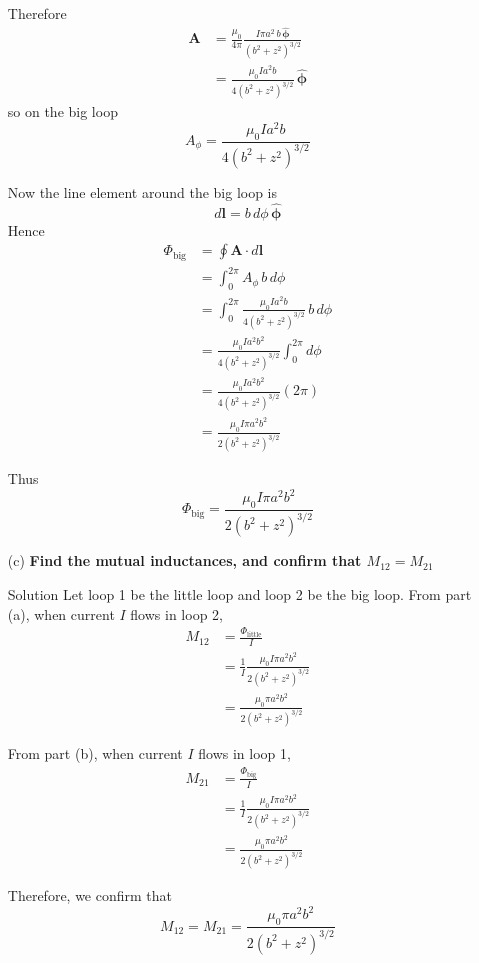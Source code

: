 \documentclass[12pt]{article}
\begin{document}
\begin{enumerate}
Therefore
\[
\begin{aligned}
\mathbf A
&=\frac{\mu_0}{4\pi}\frac{I\pi a^2\,b\,\hat{\boldsymbol\phi}}{\left(b^2+z^2\right)^{3/2}}\\[4pt]
&=\frac{\mu_0 I a^2 b}{4\left(b^2+z^2\right)^{3/2}}\,\hat{\boldsymbol\phi}
\end{aligned}
\]
so on the big loop
\[
A_\phi=\frac{\mu_0 I a^2 b}{4\left(b^2+z^2\right)^{3/2}}
\]

Now the line element around the big loop is
\[
d\mathbf l=b\,d\phi\,\hat{\boldsymbol\phi}
\]
Hence
\[
\begin{aligned}
\Phi_{\text{big}}
&=\oint \mathbf A\cdot d\mathbf l\\[4pt]
&=\int_0^{2\pi} A_\phi\,b\,d\phi\\[4pt]
&=\int_0^{2\pi}\frac{\mu_0 I a^2 b}{4\left(b^2+z^2\right)^{3/2}}\,b\,d\phi\\[4pt]
&=\frac{\mu_0 I a^2 b^2}{4\left(b^2+z^2\right)^{3/2}}\int_0^{2\pi} d\phi\\[4pt]
&=\frac{\mu_0 I a^2 b^2}{4\left(b^2+z^2\right)^{3/2}}(2\pi)\\[4pt]
&=\frac{\mu_0 I\pi a^2 b^2}{2\left(b^2+z^2\right)^{3/2}}
\end{aligned}
\]

Thus
\[
\boxed{\Phi_{\text{big}}=\frac{\mu_0 I\pi a^2 b^2}{2\left(b^2+z^2\right)^{3/2}}}
\]

\item[(c)] \textbf{Find the mutual inductances, and confirm that $M_{12}=M_{21}$}

\item[Solution]
Let loop 1 be the little loop and loop 2 be the big loop. From part (a), when current $I$ flows in loop 2,
\[
\begin{aligned}
M_{12}
&=\frac{\Phi_{\text{little}}}{I}\\[4pt]
&=\frac{1}{I}\frac{\mu_0 I\pi a^2 b^2}{2\left(b^2+z^2\right)^{3/2}}\\[4pt]
&=\frac{\mu_0 \pi a^2 b^2}{2\left(b^2+z^2\right)^{3/2}}
\end{aligned}
\]

From part (b), when current $I$ flows in loop 1,
\[
\begin{aligned}
M_{21}
&=\frac{\Phi_{\text{big}}}{I}\\[4pt]
&=\frac{1}{I}\frac{\mu_0 I\pi a^2 b^2}{2\left(b^2+z^2\right)^{3/2}}\\[4pt]
&=\frac{\mu_0 \pi a^2 b^2}{2\left(b^2+z^2\right)^{3/2}}
\end{aligned}
\]

Therefore, we confirm that
\[
\boxed{M_{12}=M_{21}=\frac{\mu_0 \pi a^2 b^2}{2\left(b^2+z^2\right)^{3/2}}}
\]

\end{enumerate}
\end{document}
